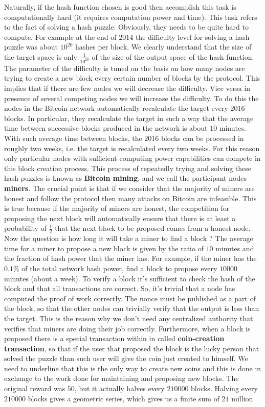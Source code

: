 Naturally, if the hash function chosen is good then accomplish this task is computationally hard (it requires computation power and time). This task refers to the fact of solving a hash puzzle. Obviously, they needs to be quite hard to compute. For example at the end of $2014$ the difficulty level for solving a hash puzzle was about $10^{20}$ hashes per block. We clearly understand that the size of the target space is only $\frac{1}{10^{20}}$ of the size of the output space of the hash function. The parameter of the difficulty is tuned on the basis on how many nodes are trying to create a new block every certain number of blocks by the protocol. This implies that if there are few nodes we will decrease the difficulty. Vice versa in presence of several competing nodes we will increase the difficulty. To do this the nodes in the Bitcoin network automatically recalculate the target every $2016$ blocks. In particular, they recalculate the target in such a way that the average time between successive blocks produced in the network is about $10$ minutes. With such average time between blocks, the $2016$ blocks can be processed in roughly two weeks, i.e. the target is recalculated every two weeks. For this reason only particular nodes with sufficient computing power capabilities can compete in this block creation process. This process of repeatedly trying and solving these hash puzzles is known as \textbf{Bitcoin mining}, and we call the participant nodes \textbf{miners}. The crucial point is that if we consider that the majority of miners are honest and follow the protocol then many attacks on Bitcoin are infeasible. This is true because if the majority of miners are honest, the competition for proposing the next block will automatically ensure that there is at least a probability of $\frac{1}{2}$ that the next block to be proposed comes from a honest node. Now the question is how long it will take a miner to find a block ? The average time for a miner to propose a new block is given by the ratio of $10$ minutes and the fraction of hash power that the miner has. For example, if the miner has the $0.1 \%$ of the total network hash power, find a block to propose every $10000$ minutes (about a week). To verify a block it's sufficient to check the hash of the block and that all transactions are correct. So, it's trivial that a node has computed the proof of work correctly. The nonce must be published as a part of the block, so that the other nodes can trivially verify that the output is less than the target. This is the reason why we don't need any centralized authority that verifies that miners are doing their job correctly. Furthermore, when a block is proposed there is a special transaction within in called \textbf{coin-creation transaction}, so that if the user that proposed the block is the lucky person that solved the puzzle than such user will give the coin just created to himself. We need to underline that this is the only way to create new coins and this is done in exchange to the work done for maintaining and proposing new blocks. The original reward was $50$, but it actually halves every $210000$ blocks. Halving every $210000$ blocks gives a geometric series, which gives us a finite sum of $21$ million 